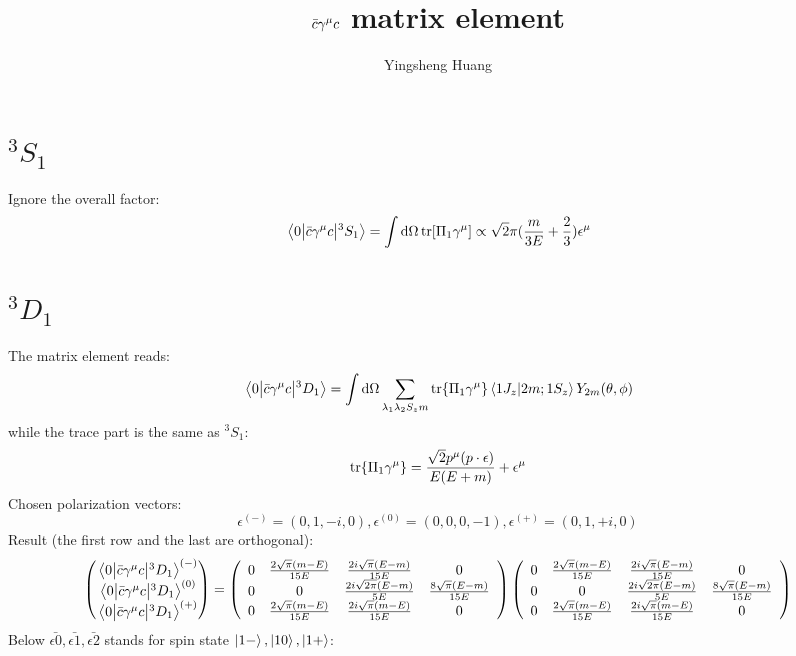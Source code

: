 \documentclass{article}
\title{$\bar c\gm c$ matrix element}
\author{Yingsheng Huang}
\newcommand{\gm}{\gamma^{\mu}}
\newcommand{\la}{\lambda}
\begin{document}
\maketitle
\section{$^3S_1$}
Ignore the overall factor:
$$\mel{0}{\bar c\gm c}{^3S_1}=\int\dd\Omega\tr[\Pi_1\gm]\propto\sqrt{2}\pi(\frac{m}{3 E}+\frac{2}{3})\epsilon^{\mu}$$
\section{$^3D_1$}
The matrix element reads:
$$\mel{0}{\bar c\gm c}{^3D_1}=\int\dd\Omega\sum_{\la_1\la_2 S_zm}\tr{\Pi_1\gm}\braket{1J_z}{2m;1S_z}Y_{2m}(\theta,\phi)$$
while the trace part is the same as $^3S_1$:
$$\tr{\Pi_1\gm}=\frac{\sqrt{2}p^{\mu}(p\cdot\epsilon)}{E(E+m)}+\epsilon^{\mu}$$
Chosen polarization vectors: 
$$\epsilon^{(-)}=(0,1,-i,0),\epsilon^{(0)}=(0,0,0,-1),\epsilon^{(+)}=(0,1,+i,0)$$
Result (the first row and the last are orthogonal):  
$$\pmqty{\mel{0}{\bar c\gm c}{^3D_1}^{(-)}\\\mel{0}{\bar c\gm c}{^3D_1}^{(0)}\\\mel{0}{\bar c\gm c}{^3D_1}^{(+)}}=\left(
\begin{array}{cccc}
 0 & \frac{2 \sqrt{\pi } (m-E)}{15 E} & \frac{2 i \sqrt{\pi } (E-m)}{15 E} & 0 \\
 0 & 0 & \frac{2 i \sqrt{2 \pi } (E-m)}{5 E} & \frac{8 \sqrt{\pi } (E-m)}{15 E} \\
 0 & \frac{2 \sqrt{\pi } (m-E)}{15 E} & \frac{2 i \sqrt{\pi } (m-E)}{15 E} & 0 \\
\end{array}
\right)\left(
\begin{array}{cccc}
 0 & \frac{2 \sqrt{\pi } (m-E)}{15 E} & \frac{2 i \sqrt{\pi } (E-m)}{15 E} & 0 \\
 0 & 0 & \frac{2 i \sqrt{2 \pi } (E-m)}{5 E} & \frac{8 \sqrt{\pi } (E-m)}{15 E} \\
 0 & \frac{2 \sqrt{\pi } (m-E)}{15 E} & \frac{2 i \sqrt{\pi } (m-E)}{15 E} & 0 \\
\end{array}
\right)$$
Below $\bar{\epsilon0},\bar{\epsilon1},\bar{\epsilon2}$ stands for spin state $\ket{1-},\ket{10},\ket{1+}$:
\end{document}
